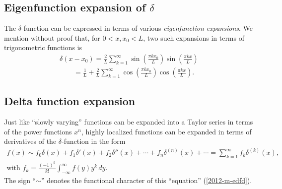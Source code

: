 \subsection{Eigenfunction expansion of $\delta$}
\label{2012-m-efed1}

The  $\delta$-function can be expressed in terms of various
{\em eigenfunction expansions}.
We mention without proof
\cite{duffy2001} that, for $0< x,x_0 <L$,
two such expansions in terms of trigonometric functions is
\begin{equation}
\begin{split}
\delta (x-x_0) =
\frac{2}{L}
\sum_{k=1}^\infty
\sin \left( \frac{\pi k x_0}{L}\right)
\sin \left( \frac{\pi k x}{L}\right)\\
\qquad  =
\frac{1}{L}
+
\frac{2}{L}
\sum_{k=1}^\infty
\cos \left( \frac{\pi k x_0}{L}\right)
\cos \left( \frac{\pi k x}{L}\right).
\end{split}
\label{2012-m-efed}
\end{equation}

\subsection{Delta function expansion}
\label{2012-m-dfex}

Just like ``slowly varying'' functions can be expanded into a Taylor series in terms of the power functions $x^n$,
highly localized functions can be expanded in terms of derivatives of the $\delta$-function in the form \cite{lindell:438}
\begin{equation}
\begin{split}
f(x) \sim
f_0 \delta (x) +
f_1 \delta' (x) +
f_2 \delta'' (x) + \cdots +f_n \delta^{(n)}(x) + \cdots =\sum_{k=1}^\infty f_k \delta^{(k)}(x),\\
\textrm{with } f_k= \frac{(-1)^k}{k!} \int_{-\infty}^\infty f(y) y^k \, dy
.
\end{split}
\label{2012-m-edfd}
\end{equation}
The sign ``$\sim$'' denotes the functional character of this ``equation'' (\ref{2012-m-edfd}).

